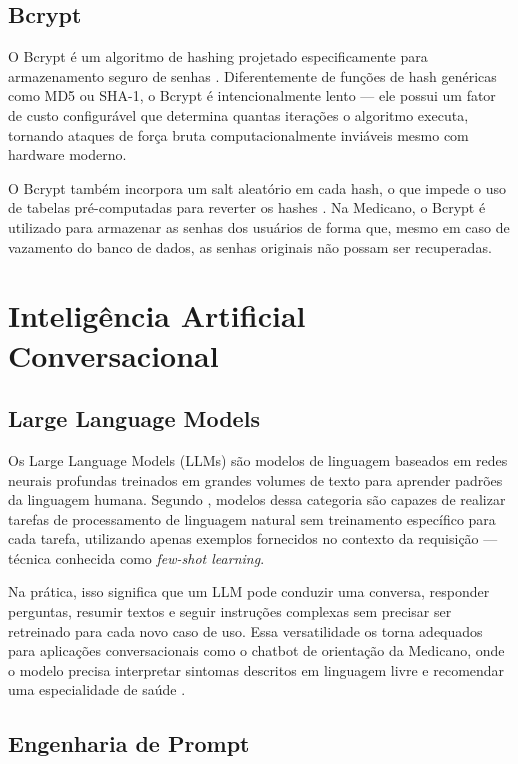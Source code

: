 \subsection{Bcrypt}
\label{subsec:bcrypt}

O Bcrypt é um algoritmo de hashing projetado
especificamente para armazenamento seguro de senhas
\cite{provos1999}. Diferentemente de funções de hash
genéricas como MD5 ou SHA-1, o Bcrypt é intencionalmente
lento — ele possui um fator de custo configurável que
determina quantas iterações o algoritmo executa, tornando
ataques de força bruta computacionalmente inviáveis mesmo
com hardware moderno.

O Bcrypt também incorpora um salt aleatório em cada hash,
o que impede o uso de tabelas pré-computadas para reverter
os hashes \cite{provos1999}. Na Medicano, o Bcrypt é
utilizado para armazenar as senhas dos usuários de forma
que, mesmo em caso de vazamento do banco de dados, as
senhas originais não possam ser recuperadas.

\section{Inteligência Artificial Conversacional}
\label{sec:conversational-ai}

\subsection{Large Language Models}
\label{subsec:llm}

Os Large Language Models (LLMs) são modelos de linguagem
baseados em redes neurais profundas treinados em grandes
volumes de texto para aprender padrões da linguagem humana.
Segundo , modelos dessa categoria
são capazes de realizar tarefas de processamento de
linguagem natural sem treinamento específico para cada
tarefa, utilizando apenas exemplos fornecidos no contexto
da requisição — técnica conhecida como
\textit{few-shot learning}.

Na prática, isso significa que um LLM pode conduzir uma
conversa, responder perguntas, resumir textos e seguir
instruções complexas sem precisar ser retreinado para
cada novo caso de uso. Essa versatilidade os torna
adequados para aplicações conversacionais como o chatbot
de orientação da Medicano, onde o modelo precisa interpretar
sintomas descritos em linguagem livre e recomendar uma
especialidade de saúde \cite{brown2020}.

\subsection{Engenharia de Prompt}
\label{subsec:prompt-engineering}

